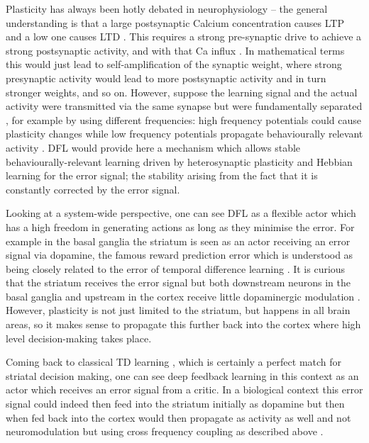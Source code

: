 \documentclass{aamas2018}
\begin{document}
Plasticity has always been hotly debated in neurophysiology -- the
general understanding is that a large postsynaptic Calcium
concentration causes LTP \cite{Malenka99,Bennett2000} and a low one
causes LTD \cite{Mulkey1992}. This requires a strong pre-synaptic
drive to achieve a strong postsynaptic activity, and with that Ca
influx \cite{Meunier2017}. In mathematical terms this would just lead
to self-amplification of the synaptic weight, where strong presynaptic
activity would lead to more postsynaptic activity and in turn stronger
weights, and so on. However, suppose the learning signal and the
actual activity were transmitted via the same synapse but were
fundamentally separated \cite{Lindsay2017}, for example by using
different frequencies: high frequency potentials could cause
plasticity changes while low frequency potentials propagate
behaviourally relevant activity \cite{Canolty2010}. DFL would provide
here a mechanism which allows stable behaviourally-relevant learning
driven by heterosynaptic plasticity and Hebbian learning for the error
signal; the stability arising from the fact that it is constantly
corrected by the error signal.

Looking at a system-wide perspective, one can see DFL as a flexible
actor which has a high freedom in generating actions as long as they
minimise the error. For example in the basal ganglia the striatum is
seen as an actor receiving an error signal via dopamine, the famous
reward prediction error \cite{Schultz97} which is understood as being
closely related to the error of temporal difference learning
\cite{gurney98:_basal_gangl_action_selec_devic}. It is curious that
the striatum receives the error signal but both downstream neurons in
the basal ganglia and upstream in the cortex receive little
dopaminergic modulation \cite{Beckstead1979}. However, plasticity is
not just limited to the striatum, but happens in all brain areas, so
it makes sense to propagate this further back into the cortex
\cite{Groenewegen1993} where high level decision-making takes place.

Coming back to classical TD learning \cite{Sutton87}, which is
certainly a perfect match for striatal decision making, one can see
deep feedback learning in this context as an actor which receives an
error signal from a critic. In a biological context this error signal
could indeed then feed into the striatum initially as dopamine but
then when fed back into the cortex would then propagate as activity
as well and not neuromodulation but using cross frequency coupling
as described above \cite{Lipski2017}.
\end{document}
